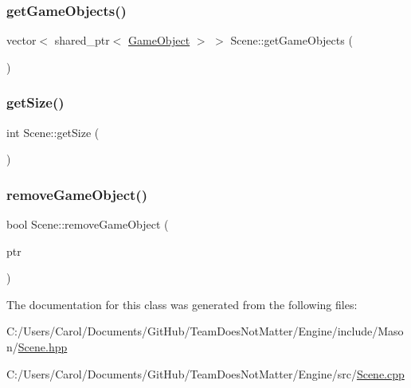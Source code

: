 \subsubsection{\texorpdfstring{get\+Game\+Objects()}{getGameObjects()}}
{\footnotesize\ttfamily vector$<$ shared\+\_\+ptr$<$ \hyperlink{class_mason_1_1_game_object}{Game\+Object} $>$ $>$ Scene\+::get\+Game\+Objects (\begin{DoxyParamCaption}{ }\end{DoxyParamCaption})}

\hypertarget{class_mason_1_1_scene_a97780dbb825e92c62b02623fe1e297fa}{}\label{class_mason_1_1_scene_a97780dbb825e92c62b02623fe1e297fa} 
\subsubsection{\texorpdfstring{get\+Size()}{getSize()}}
{\footnotesize\ttfamily int Scene\+::get\+Size (\begin{DoxyParamCaption}{ }\end{DoxyParamCaption})}

\hypertarget{class_mason_1_1_scene_aad5427fcdd330f65dc4e7b1e627afce4}{}\label{class_mason_1_1_scene_aad5427fcdd330f65dc4e7b1e627afce4} 
\subsubsection{\texorpdfstring{remove\+Game\+Object()}{removeGameObject()}}
{\footnotesize\ttfamily bool Scene\+::remove\+Game\+Object (\begin{DoxyParamCaption}\item[{std\+::shared\+\_\+ptr$<$ \hyperlink{class_mason_1_1_game_object}{Game\+Object} $>$}]{ptr }\end{DoxyParamCaption})}



The documentation for this class was generated from the following files\+:\begin{DoxyCompactItemize}
\item 
C\+:/\+Users/\+Carol/\+Documents/\+Git\+Hub/\+Team\+Does\+Not\+Matter/\+Engine/include/\+Mason/\hyperlink{_scene_8hpp}{Scene.\+hpp}\item 
C\+:/\+Users/\+Carol/\+Documents/\+Git\+Hub/\+Team\+Does\+Not\+Matter/\+Engine/src/\hyperlink{_scene_8cpp}{Scene.\+cpp}\end{DoxyCompactItemize}
